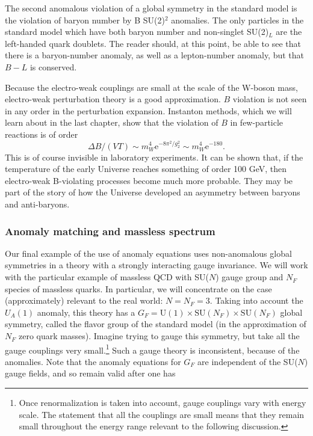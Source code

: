 The second anomalous violation of a global symmetry in the standard model is
the violation of baryon number by B SU(2)$^2$ anomalies. The only particles in
the standard model which have both baryon number and non-singlet SU(2)$_L$ are
the left-handed quark doublets. The reader should, at this point, be able to
see that there is a baryon-number anomaly, as well as a lepton-number anomaly,
but that $B-L$ is conserved.


Because the electro-weak couplings are small at
the scale of the W-boson mass, electro-weak perturbation theory is a good
approximation. $B$ violation is not seen in any order in the perturbation
expansion. Instanton methods, which we will learn about in the last chapter,
show that the violation of $B$ in few-particle reactions is of order
\[
  \Delta B/(VT)\sim m_W^4\mathrm{e}^{-8\pi^2/g_2^2}
  \sim m_W^4\mathrm{e}^{-180} .
\]
This is of course invisible in laboratory experiments. It can be shown that,
if the temperature of the early Universe reaches something of order 100 GeV,
then electro-weak B-violating processes become much more probable. They may
be part of the story of how the Universe developed an asymmetry between
baryons and anti-baryons.


\subsubsection{Anomaly matching and massless spectrum}

Our final example of the use of anomaly equations uses non-anomalous global
symmetries in a theory with a strongly interacting gauge invariance. We will
work with the particular example of massless QCD with SU($N$) gauge group and
$N_F$ species of massless quarks. In particular, we will concentrate on the
case (approximately) relevant to the real world: $N=N_F=3$. Taking into
account the $U_A(1)$ anomaly, this theory has a
$G_F=\mathrm{U}(1)\times\mathrm{SU}(N_F)\times\mathrm{SU}(N_F)$ global
symmetry, called the flavor group of the standard model (in the approximation
of $N_F$ zero quark masses). Imagine trying to gauge this symmetry, but take
all the gauge couplings very small.\footnote[19]{Once renormalization is taken
into account, gauge couplings vary with energy scale. The statement that all
the couplings are small means that they remain small throughout the energy
range relevant to the following discussion.} Such a gauge theory is
inconsistent, because of the anomalies. Note that the anomaly equations for
$G_F$ are independent of the SU($N$) gauge fields, and so remain valid after
one has


